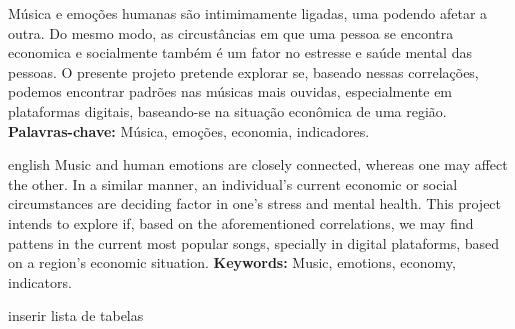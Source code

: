 \documentclass[
  12pt,       %
  openright,      %
  oneside,      %
  a4paper,      %
  english,      %
  french,       %
  spanish,      %
  brazil,       %
  ]{abntex2}
\renewcommand{\lstlistlistingname}{Lista de códigos} %
\begin{document}

\setlength{\absparsep}{18pt} %
\begin{resumo}
Música e emoções humanas são intimimamente ligadas, uma podendo afetar a outra. Do mesmo modo, as circustâncias em que uma pessoa se encontra economica e socialmente também é um fator no estresse e saúde mental das pessoas. O presente projeto pretende explorar se, baseado nessas correlações, podemos encontrar padrões nas músicas mais ouvidas, especialmente em plataformas digitais, baseando-se na situação econômica de uma região.
\textbf{Palavras-chave:} Música, emoções, economia, indicadores.
\end{resumo}

\begin{resumo}[Abstract]
 \begin{otherlanguage*}{english}
Music and human emotions are closely connected, whereas one may affect the other. In a similar manner, an individual's current economic or social circumstances are deciding factor in one's stress and mental health. This project intends to explore if, based on the aforementioned correlations, we may find pattens in the current most popular songs, specially in digital plataforms, based on a region's economic situation.
\textbf{Keywords:} Music, emotions, economy, indicators.
 \end{otherlanguage*}
\end{resumo}  



\listoffigures*
\cleardoublepage



inserir lista de tabelas
\listoftables*
\cleardoublepage


 
\pdfbookmark[0]{\lstlistlistingname}{lof}
\lstlistoflistings
\cleardoublepage
\end{document}
